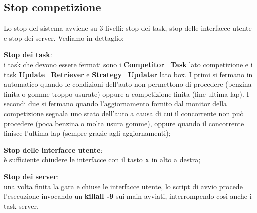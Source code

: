 \subsection{Stop competizione}
Lo stop del sistema avviene su 3 livelli: stop dei task, stop delle interfacce
utente e stop dei server. Vediamo in dettaglio:
\begin{description}
\item{\textbf{Stop dei task}}:\\
i task che devono essere fermati sono i \textbf{Competitor\_Task} lato
competizione e i task \textbf{Update\_Retriever} e \textbf{Strategy\_Updater}
lato box.
I primi si fermano in automatico quando le condizioni dell'auto non permettono
di procedere (benzina finita o gomme troppo usurate) oppure a competizione
finita
(fine ultima lap). I secondi due si fermano quando l'aggiornamento fornito dal
monitor della competizione segnala uno stato dell'auto a causa di cui il 
concorrente non pu\`{o} procedere (poca benzina o molta usura gomme), oppure
quando il concorrente finisce l'ultima lap (sempre grazie agli aggiornamenti);
\item{\textbf{Stop delle interfacce utente}}:\\
\`{e} sufficiente chiudere le interfacce con il tasto \textbf{x} in alto a
destra;
\item{\textbf{Stop dei server}}:\\
una volta finita la gara e chiuse le interfacce utente, lo script di avvio
procede l'esecuzione invocando un \textbf{killall -9} sui main avviati,
interrompendo
cos\`{i} anche i task server.
\end{description}